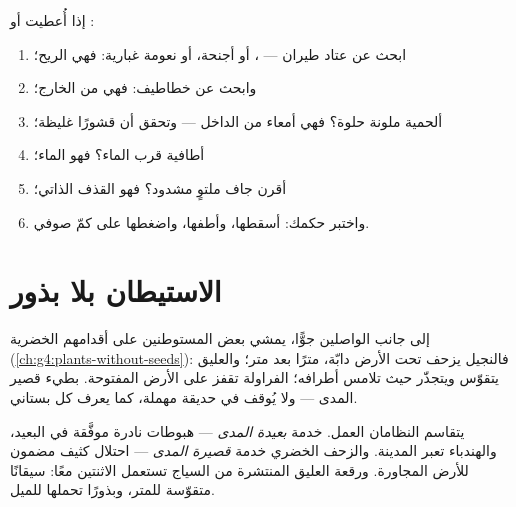 \begin{method}\label{met:g6:how-plants-spread:name}
إذا أُعطيت  أو :
\begin{enumerate}
  \item ابحث عن عتاد طيران --- ، أو أجنحة، أو نعومة غبارية:
        فهي الريح؛
  \item وابحث عن خطاطيف: فهي   من الخارج؛
  \item ألحمية ملونة حلوة؟ فهي أمعاء  من الداخل ---
        وتحقق أن  قشورًا غليظة؛
  \item أطافية قرب الماء؟ فهو الماء؛
  \item أقرن جاف ملتوٍ مشدود؟ فهو القذف الذاتي؛
  \item واختبر حكمك: أسقطها، وأطفها، واضغطها على كمّ صوفي.
\end{enumerate}
\end{method}

\section{الاستيطان بلا بذور}

\begin{example}\label{ex:g6:how-plants-spread:vegetative}
إلى جانب الواصلين جوًّا، يمشي بعض المستوطنين على أقدامهم الخضرية
(\cref{ch:g4:plants-without-seeds}): فالنجيل يزحف تحت الأرض
 دابّة، مترًا بعد متر؛ والعليق يتقوّس ويتجذّر حيث تلامس
أطرافه؛  الفراولة تقفز على الأرض المفتوحة. بطيء قصير
المدى --- ولا يُوقف في حديقة مهملة، كما يعرف كل بستاني.
\end{example}

\begin{remark}\label{rem:g6:how-plants-spread:twospeeds}
يتقاسم النظامان العمل.   خدمة \emph{بعيدة المدى}
--- هبوطات نادرة موفَّقة في البعيد، والهندباء تعبر المدينة. والزحف
الخضري خدمة \emph{قصيرة المدى} --- احتلال كثيف مضمون للأرض
المجاورة. ورقعة العليق المنتشرة من السياج تستعمل الاثنتين معًا:
سيقانًا متقوّسة للمتر، وبذورًا تحملها  للميل.
\end{remark}

